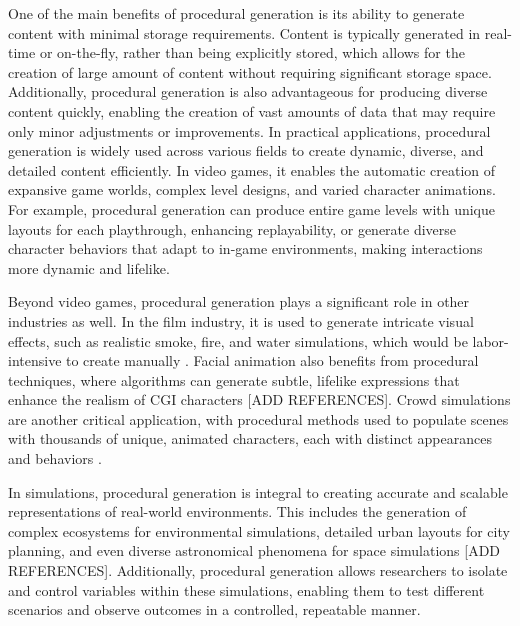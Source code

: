 One of the main benefits of procedural generation is its ability to generate content with minimal storage requirements. Content is typically generated in real-time or on-the-fly, rather than being explicitly stored, which allows for the creation of large amount of content without requiring significant storage space. Additionally, procedural generation is also advantageous for producing diverse content quickly, enabling the creation of vast amounts of data that may require only minor adjustments or improvements.
In practical applications, procedural generation is widely used across various fields to create dynamic, diverse, and detailed content efficiently. In video games, it enables the automatic creation of expansive game worlds, complex level designs, and varied character animations. For example, procedural generation can produce entire game levels with unique layouts for each playthrough, enhancing replayability, or generate diverse character behaviors that adapt to in-game environments, making interactions more dynamic and lifelike.

Beyond video games, procedural generation plays a significant role in other industries as well. In the film industry, it is used to generate intricate visual effects, such as realistic smoke, fire, and water simulations, which would be labor-intensive to create manually \cite{Stam2003a,Hadrich2021,Fedkiw2001,Xing2016}. Facial animation also benefits from procedural techniques, where algorithms can generate subtle, lifelike expressions that enhance the realism of CGI characters [ADD REFERENCES]. Crowd simulations are another critical application, with procedural methods used to populate scenes with thousands of unique, animated characters, each with distinct appearances and behaviors \cite{Yersin2011,Park2010,Narain2011}.

In simulations, procedural generation is integral to creating accurate and scalable representations of real-world environments. This includes the generation of complex ecosystems for environmental simulations, detailed urban layouts for city planning, and even diverse astronomical phenomena for space simulations [ADD REFERENCES]. Additionally, procedural generation allows researchers to isolate and control variables within these simulations, enabling them to test different scenarios and observe outcomes in a controlled, repeatable manner.


